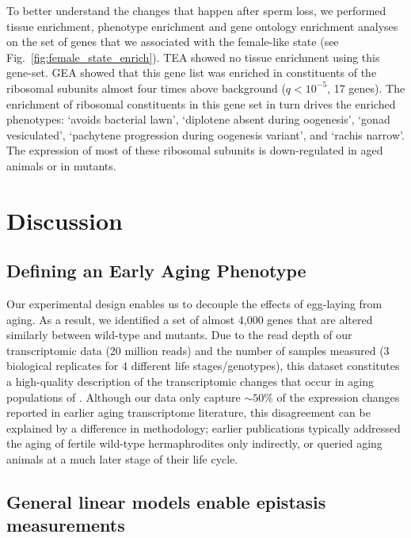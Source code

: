 To better understand the changes that happen after sperm loss, we performed
tissue enrichment, phenotype enrichment and gene ontology enrichment analyses on
the set of \femalen{} genes that we associated with the female-like state (see
Fig.~\ref{fig:female_state_enrich}). TEA showed no tissue enrichment using this
gene-set. GEA showed that this gene list was enriched in constituents of the
ribosomal subunits almost four times above background ($q<10^{-5}$, 17 genes).
The enrichment of ribosomal constituents in this gene set in turn drives the
enriched phenotypes: `avoids bacterial lawn', `diplotene absent during
oogenesis', `gonad vesiculated', `pachytene progression during oogenesis
variant', and `rachis narrow'. The expression of most of these ribosomal
subunits is down-regulated in aged animals or in \fog{} mutants.

\section*{Discussion}
\label{sec:fem_discussion}

\subsection*{Defining an Early Aging Phenotype}
\label{sub:Defining an Early Aging Phenotype}

Our experimental design enables us to decouple the effects of egg-laying from
aging. As a result, we identified a set of almost 4,000 genes that are altered
similarly between wild-type and \fog{} mutants. Due to the read depth of our
transcriptomic data (20 million reads) and the number of samples measured (3
biological replicates for 4 different life stages/genotypes), this dataset
constitutes a high-quality description of the transcriptomic changes that occur
in aging populations of \cel{}. Although our data only capture $\sim50\%$ of the
expression changes reported in earlier aging transcriptome literature, this
disagreement can be explained by a difference in methodology; earlier
publications typically addressed the aging of fertile wild-type hermaphrodites
only indirectly, or queried aging animals at a much later stage of their life
cycle.


\subsection*{General linear models enable epistasis measurements}
\label{sub:lin_models}

